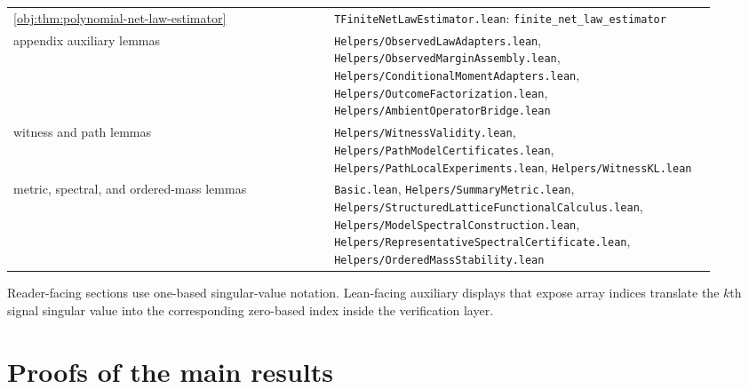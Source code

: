 \documentclass[11pt]{article}
\begin{document}
\begin{center}
\begin{tabular}{p{0.42\linewidth}p{0.5\linewidth}}
\cref{obj:thm:polynomial-net-law-estimator} & \texttt{TFiniteNetLawEstimator.lean}: \texttt{finite\_net\_law\_estimator}\\
appendix auxiliary lemmas & \texttt{Helpers/ObservedLawAdapters.lean}, \texttt{Helpers/ObservedMarginAssembly.lean}, \texttt{Helpers/ConditionalMomentAdapters.lean}, \texttt{Helpers/OutcomeFactorization.lean}, \texttt{Helpers/AmbientOperatorBridge.lean}\\
witness and path lemmas & \texttt{Helpers/WitnessValidity.lean}, \texttt{Helpers/PathModelCertificates.lean}, \texttt{Helpers/PathLocalExperiments.lean}, \texttt{Helpers/WitnessKL.lean}\\
metric, spectral, and ordered-mass lemmas & \texttt{Basic.lean}, \texttt{Helpers/SummaryMetric.lean}, \texttt{Helpers/StructuredLatticeFunctionalCalculus.lean}, \texttt{Helpers/ModelSpectralConstruction.lean}, \texttt{Helpers/RepresentativeSpectralCertificate.lean}, \texttt{Helpers/OrderedMassStability.lean}\\
\end{tabular}
\end{center}

Reader-facing sections use one-based singular-value notation. Lean-facing auxiliary displays that expose array indices translate the \(k\)th signal singular value into the corresponding zero-based index inside the verification layer.


\section{Proofs of the main results}\label{sec:deferred-proofs}
\end{document}
